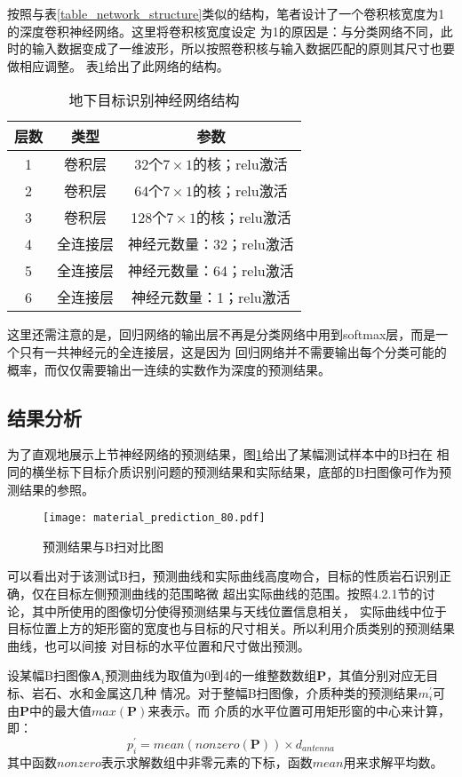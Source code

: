 按照与表\ref{table_network_structure}类似的结构，笔者设计了一个卷积核宽度为1的深度卷积神经网络。这里将卷积核宽度设定
为1的原因是：与分类网络不同，此时的输入数据变成了一维波形，所以按照卷积核与输入数据匹配的原则其尺寸也要做相应调整。
表\ref{table_regression_structure}给出了此网络的结构。
\begin{table}[h]
	\caption{地下目标识别神经网络结构} 
	\begin{tabular}{|c|c|c|} 
		\hline  
		层数 &  类型 & 参数\\
		\hline 
		1 & 卷积层 & 32个$7\times 1$的核；relu激活\\  
		\hline
		2 & 卷积层 & 64个$7\times 1$的核；relu激活\\  
		\hline
		3 & 卷积层 & 128个$7\times 1$的核；relu激活\\
		\hline
		4 & 全连接层 & 神经元数量：32；relu激活\\
		\hline
		5 & 全连接层 & 神经元数量：64；relu激活\\
		\hline
		6 & 全连接层 & 神经元数量：1；relu激活\\
		\hline  
	\end{tabular}
	\label{table_regression_structure}
\end{table}

这里还需注意的是，回归网络的输出层不再是分类网络中用到softmax层，而是一个只有一共神经元的全连接层，这是因为
回归网络并不需要输出每个分类可能的概率，而仅仅需要输出一连续的实数作为深度的预测结果。
\subsection{结果分析}
为了直观地展示上节神经网络的预测结果，图\ref{material_prediction}给出了某幅测试样本中的B扫在
相同的横坐标下目标介质识别问题的预测结果和实际结果，底部的B扫图像可作为预测结果的参照。
\begin{figure}[htbp]
	\texttt{[image: material\_prediction\_80.pdf]}
	\caption[]{预测结果与B扫对比图}
	\label{material_prediction}
\end{figure}

可以看出对于该测试B扫，预测曲线和实际曲线高度吻合，目标的性质岩石识别正确，仅在目标左侧预测曲线的范围略微
超出实际曲线的范围。按照4.2.1节的讨论，其中所使用的图像切分使得预测结果与天线位置信息相关，
实际曲线中位于目标位置上方的矩形窗的宽度也与目标的尺寸相关。所以利用介质类别的预测结果曲线，也可以间接
对目标的水平位置和尺寸做出预测。

设某幅B扫图像$\mathbf{A}_i$预测曲线为取值为0到4的一维整数数组$\mathbf{P}$，其值分别对应无目标、岩石、水和金属这几种
情况。对于整幅B扫图像，介质种类的预测结果$m_i^{\prime}$可由$\mathbf{P}$中的最大值$max(\mathbf{P})$来表示。而
介质的水平位置可用矩形窗的中心来计算，即：
\begin{equation}
	p_i^{\prime} = mean(nonzero(\mathbf{P}))\times d_{antenna}
\end{equation}
其中函数$nonzero$表示求解数组中非零元素的下标，函数$mean$用来求解平均数。


